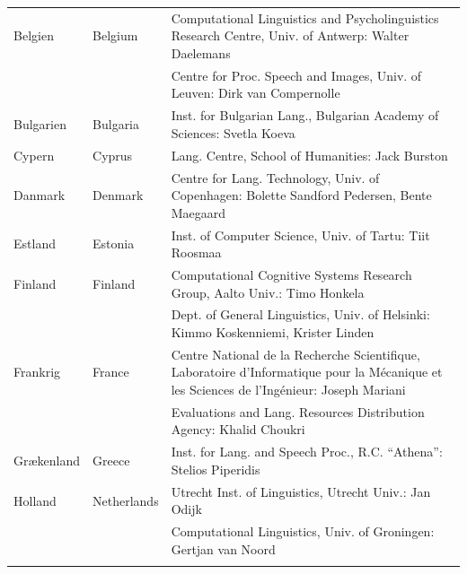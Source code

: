 \documentclass[]{../../metanetpaper}
\begin{document}
\cleardoublepage

\appendix
{}



  
\cleardoublepage

\label{metanetmembers}

\small
\begin{longtable}{llp{105mm}}
  Belgien & \textcolor{grey1}{Belgium} & Computational Linguistics and Psycholinguistics Research Centre, Univ. of Antwerp: Walter Daelemans\\ \addlinespace
  & & Centre for Proc. Speech and Images, Univ. of Leuven: Dirk van Compernolle \\ \addlinespace
  Bulgarien & \textcolor{grey1}{Bulgaria} & Inst. for Bulgarian Lang., Bulgarian Academy of Sciences: Svetla Koeva \\ \addlinespace
Cypern & \textcolor{grey1}{Cyprus} & Lang. Centre, School of Humanities: Jack Burston \\ \addlinespace
Danmark &  \textcolor{grey1}{Denmark} & Centre for Lang. Technology, Univ. of Copenhagen: Bolette Sandford Pedersen, Bente Maegaard\\ \addlinespace
  Estland & \textcolor{grey1}{Estonia} & Inst. of Computer Science, Univ. of Tartu: Tiit Roosmaa\\ \addlinespace
  Finland & \textcolor{grey1}{Finland} & Computational Cognitive Systems Research Group, Aalto Univ.: Timo Honkela\\ \addlinespace
  & & Dept. of General Linguistics, Univ. of Helsinki: Kimmo Koskenniemi, Krister Linden \\ \addlinespace
  Frankrig & \textcolor{grey1}{France} & Centre National de la Recherche Scientifique, Laboratoire d'Informatique pour la Mécanique et les Sciences de l'Ingénieur: Joseph Mariani \\ \addlinespace
  & & Evaluations and Lang. Resources Distribution Agency: Khalid Choukri\\ \addlinespace 
  Gr\ae kenland & \textcolor{grey1}{Greece} & Inst. for Lang. and Speech Proc., R.C. “Athena”: Stelios Piperidis\\ \addlinespace
 Holland & \textcolor{grey1}{Netherlands} & Utrecht Inst. of Linguistics, Utrecht Univ.: Jan Odijk\\ \addlinespace 
  & & Computational Linguistics, Univ. of Groningen: Gertjan van Noord\\ \addlinespace

\end{longtable}
\end{document}
